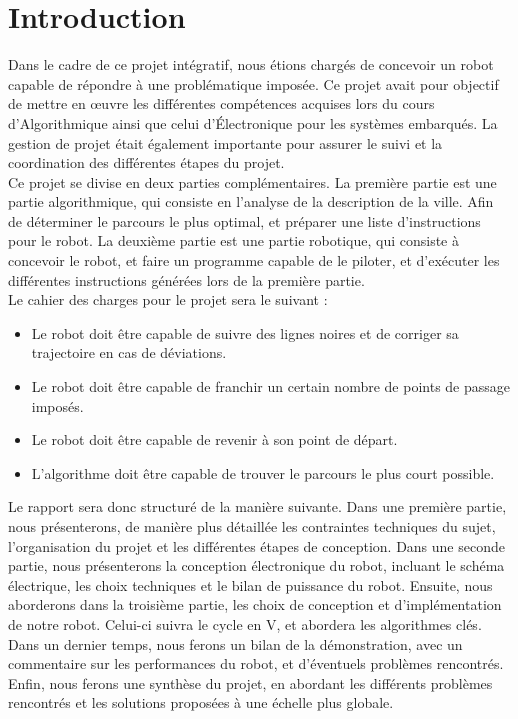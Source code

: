 \chapter*{Introduction}

Dans le cadre de ce projet intégratif, nous étions chargés de concevoir un robot capable de répondre à une problématique imposée. Ce projet avait pour objectif de mettre en \oe uvre les différentes compétences acquises lors du cours d'Algorithmique ainsi que celui d'Électronique pour les systèmes embarqués. La gestion de projet était également importante pour assurer le suivi et la coordination des différentes étapes du projet.\\


\noindent Ce projet se divise en deux parties complémentaires. La première partie est une partie algorithmique, qui consiste en l'analyse de la description de la ville. Afin de déterminer le parcours le plus optimal, et préparer une liste d'instructions pour le robot. La deuxième partie est une partie robotique, qui consiste à concevoir le robot, et faire un programme capable de le piloter, et d'exécuter les différentes instructions générées lors de la première partie.\\

\noindent Le cahier des charges pour le projet sera le suivant :
\begin{itemize}
    \item Le robot doit être capable de suivre des lignes noires et de corriger sa trajectoire en cas de déviations.
    \item Le robot doit être capable de franchir un certain nombre de points de passage imposés.
    \item Le robot doit être capable de revenir à son point de départ.
    \item L'algorithme doit être capable de trouver le parcours le plus court possible.
\end{itemize}

\vspace{1cm}

\noindent Le rapport sera donc structuré de la manière suivante. Dans une première partie, nous présenterons, de manière plus détaillée les contraintes techniques du sujet, l'organisation du projet et les différentes étapes de conception. Dans une seconde partie, nous présenterons la conception électronique du robot, incluant le schéma électrique, les choix techniques et le bilan de puissance du robot. Ensuite, nous aborderons dans la troisième partie, les choix de conception et d'implémentation de notre robot. Celui-ci suivra le cycle en V, et abordera les algorithmes clés. Dans un dernier temps, nous ferons un bilan de la démonstration, avec un commentaire sur les performances du robot, et d'éventuels problèmes rencontrés. Enfin, nous ferons une synthèse du projet, en abordant les différents problèmes rencontrés et les solutions proposées à une échelle plus globale.\\

